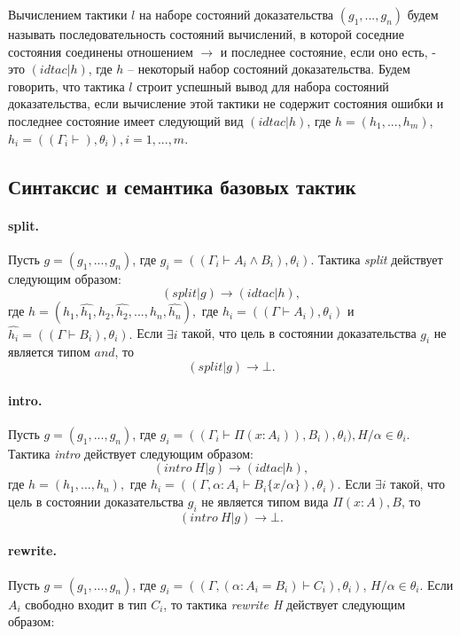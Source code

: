 \documentclass[12pt]{article}
\begin{document}
Вычислением тактики $l$ на наборе состояний доказательства $(g_1,...,g_n)$ будем называть последовательность состояний вычислений, в которой соседние состояния соединены отношением $\xrightarrow{}$ и последнее состояние, если оно есть, - это $(idtac|h)$, где $h$ -- некоторый набор состояний доказательства. Будем говорить, что тактика $l$ строит успешный вывод для набора состояний доказательства, если вычисление этой тактики не содержит состояния ошибки и последнее состояние имеет следующий вид $(idtac|h)$, где $h=(h_1,...,h_m)$, $h_i= ((\Gamma_i \vdash),\theta_i),i=1,...,m$.

\subsection{Синтаксис и семантика базовых тактик}
\paragraph{split.}
Пусть $g = (g_1, ..., g_n)$, где $g_i = ((\Gamma_i \vdash A_i \wedge B_i), \theta_i)$.
Тактика \textit{split} действует следующим образом:
$$(split|g) \xrightarrow{} (idtac| h),$$
где $h=(h_1,\hat{h_1},h_2,\hat{h_2},...,h_n,\hat{h_n}),$ где $h_i= ((\Gamma \vdash A_i), \theta_i)$ и $\hat{h_i}= ((\Gamma \vdash B_i), \theta_i).$
Если $\exists i$ такой, что цель в состоянии доказательства $g_i$ не является типом $and$, то
$$(split|g) \xrightarrow{} \bot.$$

\paragraph{intro.}
Пусть $g = (g_1, ..., g_n)$, где $g_i = ((\Gamma_i \vdash \Pi (x:A_i)), B_i), \theta_i), H/\alpha \in \theta_i$.
Тактика \textit{intro} действует следующим образом:
$$(intro\ H|g) \xrightarrow{} (idtac| h),$$
где $h=(h_1,...,h_n),$ где $h_i= ((\Gamma, \alpha:A_i \vdash B_i\{x/\alpha\}), \theta_i).$
Если $\exists i$ такой, что цель в состоянии доказательства $g_i$ не является типом вида $\Pi (x:A), B$, то
$$(intro\ H|g) \xrightarrow{} \bot.$$

\paragraph{rewrite.}
Пусть $g = (g_1, ..., g_n)$, где $g_i = ((\Gamma, (\alpha: A_i = B_i) \vdash C_i), \theta_i)$, $H/\alpha \in \theta_i$.
Если $A_i$ свободно входит в тип $C_i$, то тактика \textit{rewrite H} действует следующим образом:
\end{document}
